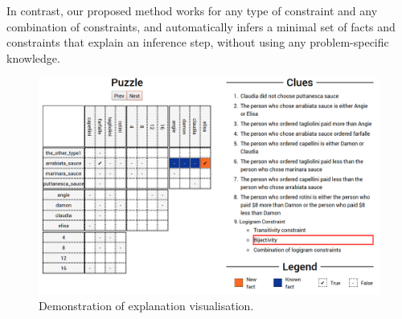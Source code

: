 In contrast, our proposed method works for any type of constraint and any combination of constraints, and automatically infers a minimal set of facts and constraints that explain an inference step, without using any problem-specific knowledge.


\begin{figure}[t]
\centering
\includegraphics[width=1\linewidth]{zebra_screen}
\caption{Demonstration of explanation visualisation.}
\label{fig:zebrascreen}
\end{figure}

